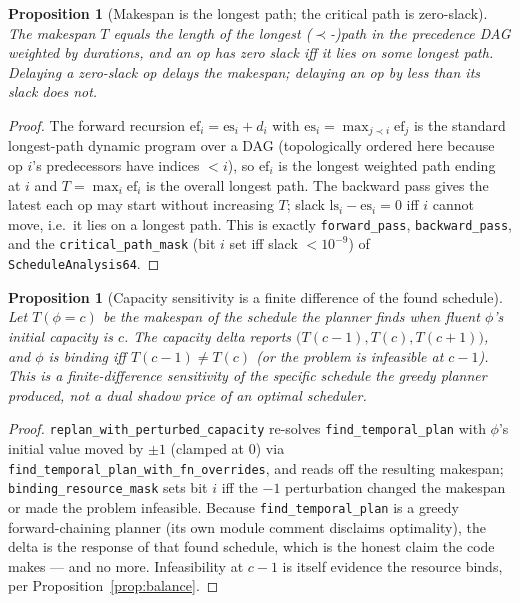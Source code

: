 \documentclass[11pt,oneside]{book}
\theoremstyle{definition}
\theoremstyle{plain}
\newtheorem{proposition}[theorem]{Proposition}
\theoremstyle{remark}
\newcommand{\code}[1]{\texttt{#1}}
\begin{document}
\begin{proposition}[Makespan is the longest path; the critical path is zero-slack]\label{prop:critical}
The makespan $T$ equals the length of the longest ($\prec$-)path in the precedence DAG weighted
by durations, and an op has zero slack iff it lies on some longest path. Delaying a zero-slack
op delays the makespan; delaying an op by less than its slack does not.
\end{proposition}

\begin{proof}
The forward recursion $\text{ef}_i=\text{es}_i+d_i$ with $\text{es}_i=\max_{j\prec
i}\text{ef}_j$ is the standard longest-path dynamic program over a DAG (topologically ordered
here because op $i$'s predecessors have indices $<i$), so $\text{ef}_i$ is the longest weighted
path ending at $i$ and $T=\max_i\text{ef}_i$ is the overall longest path. The backward pass
gives the latest each op may start without increasing $T$; slack $\text{ls}_i-\text{es}_i=0$ iff
$i$ cannot move, i.e.\ it lies on a longest path. This is exactly \code{forward\_pass},
\code{backward\_pass}, and the \code{critical\_path\_mask} (bit $i$ set iff slack $<10^{-9}$) of
\code{ScheduleAnalysis64}. \end{proof}

\begin{proposition}[Capacity sensitivity is a finite difference of the found schedule]\label{prop:sensitivity}
Let $T(\phi=c)$ be the makespan of the schedule the planner finds when fluent $\phi$'s initial
capacity is $c$. The \emph{capacity delta} reports $\bigl(T(c-1),T(c),T(c+1)\bigr)$, and $\phi$
is \emph{binding} iff $T(c-1)\neq T(c)$ (or the problem is infeasible at $c-1$). This is a
finite-difference sensitivity of the \emph{specific schedule the greedy planner produced}, not
a dual shadow price of an optimal scheduler.
\end{proposition}

\begin{proof}
\code{replan\_with\_perturbed\_capacity} re-solves \code{find\_temporal\_plan} with $\phi$'s
initial value moved by $\pm1$ (clamped at $0$) via \code{find\_temporal\_plan\_with\_fn\_overrides},
and reads off the resulting makespan; \code{binding\_resource\_mask} sets bit $i$ iff the $-1$
perturbation changed the makespan or made the problem infeasible. Because
\code{find\_temporal\_plan} is a greedy forward-chaining planner (its own module comment
disclaims optimality), the delta is the response of that found schedule, which is the honest
claim the code makes --- and no more. Infeasibility at $c-1$ is itself evidence the resource
binds, per Proposition~\ref{prop:balance}. \end{proof}
\end{document}
